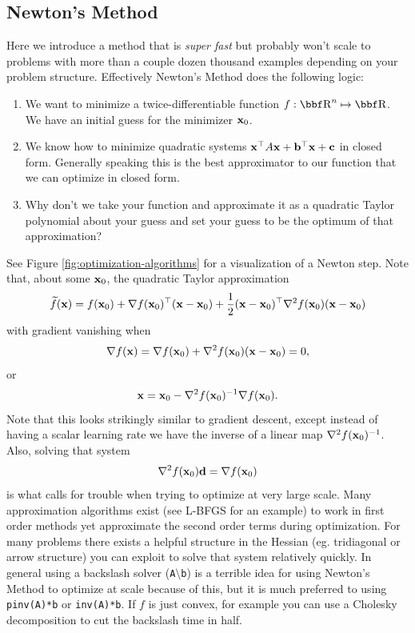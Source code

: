 \documentclass{article}
\begin{document}
\subsection{Newton's Method}

Here we introduce a method that is \textit{super fast} but probably won't scale
to problems with more than a couple dozen thousand examples depending on your
problem structure. Effectively Newton's Method does the following logic:
\begin{enumerate}
    \item We want to minimize a twice-differentiable function $f : \RR^n \mapsto \RR$. We have an
        initial guess for the minimizer ${\bf x}_0$.
    \item We know how to minimize quadratic systems ${\bf x}^\top A{\bf x} + {\bf b}^\top{\bf x} + {\bf c}$
        in closed form. Generally speaking this is the best approximator to our function
        that we can optimize in closed form.
    \item Why don't we take your function and approximate it as a quadratic Taylor
        polynomial about your guess and set your guess to be the optimum of that
        approximation?
\end{enumerate}
See Figure \ref{fig:optimization-algorithms} for a visualization of a Newton step. Note 
that, about some ${\bf x}_0$, the quadratic Taylor approximation
\[
    \widetilde f({\bf x}) = f({\bf x}_0) + \nabla f({\bf x}_0)^\top({\bf x} - {\bf x}_0) + \frac{1}{2}({\bf x}-{\bf x}_0)^\top\nabla^2 f({\bf x}_0)({\bf x}-{\bf x}_0)
\]
with gradient vanishing when
\[
    \nabla f({\bf x}) = \nabla f({\bf x}_0) + \nabla^2 f({\bf x}_0)({\bf x}-{\bf x}_0) = 0,
\]
or
\[
    {\bf x} = {\bf x}_0 - \nabla^2 f({\bf x}_0)^{-1} \nabla f({\bf x}_0).
\]
Note that this looks strikingly similar to gradient descent, except instead of having
a scalar learning rate we have the inverse of a linear map $\nabla^2 f({\bf x}_0)^{-1}$.
Also, solving that system
\[
    \nabla^2f({\bf x}_0){\bf d} = \nabla f({\bf x}_0)
\]
is what calls for trouble when trying to optimize at very large scale.
Many approximation algorithms exist (see L-BFGS for an example) to work
in first order methods yet approximate the second order terms during optimization.
For many problems there exists a helpful structure in the Hessian (eg. tridiagonal
or arrow structure) you can exploit to solve that system relatively quickly. In
general using a backslash solver (\texttt{A$\setminus$b}) is a terrible idea for
using Newton's Method to optimize at scale because of this, but it is much preferred
to using \texttt{pinv(A)*b} or \texttt{inv(A)*b}. If $f$ is just convex, for example you can use a
Cholesky decomposition to cut the backslash time in half.
\end{document}
